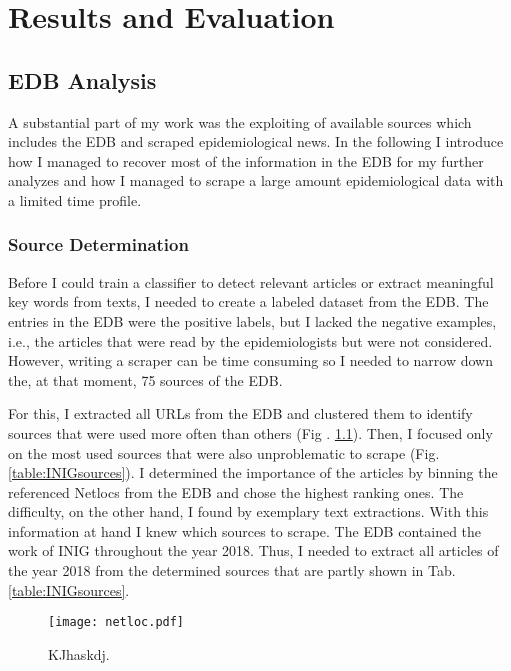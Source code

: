 \chapter{Results and Evaluation}

\section{EDB Analysis}\label{edb analysis}
A substantial part of my work was the exploiting of available sources which includes the EDB and scraped epidemiological news. In the following I introduce how I managed to recover most of the information in the EDB for my further analyzes and how I managed to scrape a large amount epidemiological data with a limited time profile.

\subsection{Source Determination}
Before I could train a classifier to detect relevant articles or extract meaningful key words from texts, I needed to create a labeled dataset from the EDB. The entries in the EDB were the positive labels, but I lacked the negative examples, i.e., the articles that were read by the epidemiologists but were not considered. However, writing a scraper can be time consuming so I needed to narrow down the, at that moment, 75 sources of the EDB.

For this, I extracted all URLs from the EDB and clustered them to identify sources that were used more often than others  (Fig . \ref{fig:netloc}). Then, I focused only on the most used sources that were also unproblematic to scrape (Fig. \ref{table:INIGsources}). I determined the importance of the articles by binning the referenced Netlocs from the EDB and chose the highest ranking ones. The difficulty, on the other hand, I found by exemplary text extractions. With this information at hand I knew which sources to scrape. The EDB contained the work of INIG throughout the year 2018. Thus, I needed to extract all articles of the year 2018 from the determined sources that are partly shown in Tab. \ref{table:INIGsources}.

\begin{figure}[h!]
    \centering
    \texttt{[image: netloc.pdf]}
    \caption{KJhaskdj.}
    \label{fig:netloc}
\end{figure}


